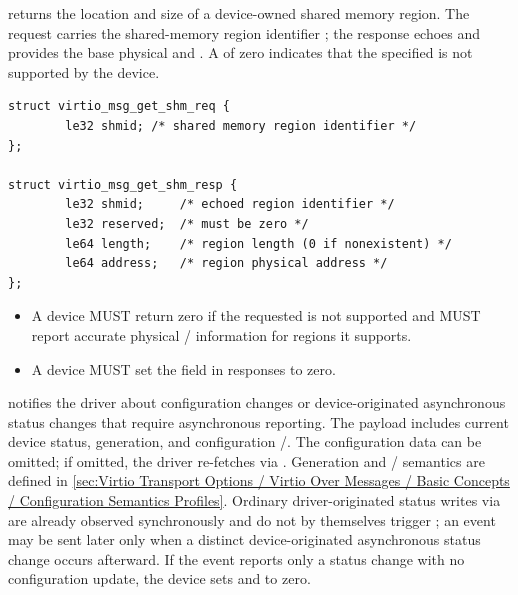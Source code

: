 
 returns the location and size of a device-owned shared memory
region. The request carries the shared-memory region identifier
; the response echoes  and provides the base
physical  and . A  of zero
indicates that the specified  is not supported by the device.

\begin{lstlisting}
struct virtio_msg_get_shm_req {
        le32 shmid; /* shared memory region identifier */
};

struct virtio_msg_get_shm_resp {
        le32 shmid;     /* echoed region identifier */
        le32 reserved;  /* must be zero */
        le64 length;    /* region length (0 if nonexistent) */
        le64 address;   /* region physical address */
};
\end{lstlisting}

\begin{itemize}
  \item A device MUST return zero  if the requested
         is not supported and MUST report accurate physical
        / information for regions it supports.
  \item A device MUST set the  field in 
        responses to zero.
\end{itemize}


 notifies the driver about configuration changes or
device-originated asynchronous status changes that require asynchronous
reporting. The payload includes current device status, generation, and
configuration /. The configuration data can be
omitted; if omitted, the driver re-fetches via . Generation
and / semantics are defined in
\ref{sec:Virtio Transport Options / Virtio Over Messages / Basic Concepts / Configuration Semantics Profiles}.
Ordinary driver-originated status writes via  are
already observed synchronously and do not by themselves trigger
; an event may be sent later only when a distinct
device-originated asynchronous status change occurs afterward.
If the event reports only a status change with no configuration update, the
device sets  and  to zero.

